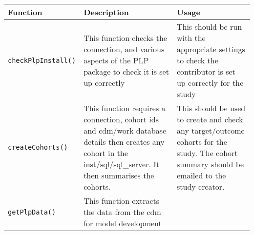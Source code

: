 \documentclass[]{article}
\begin{document}
\begin{longtable}[]{@{}lll@{}}
\toprule
\begin{minipage}[b]{0.11\columnwidth}\raggedright\strut
Function\strut
\end{minipage} & \begin{minipage}[b]{0.18\columnwidth}\raggedright\strut
Description\strut
\end{minipage} & \begin{minipage}[b]{0.10\columnwidth}\raggedright\strut
Usage\strut
\end{minipage}\tabularnewline
\midrule
\endhead
\begin{minipage}[t]{0.11\columnwidth}\raggedright\strut
\texttt{checkPlpInstall()}\strut
\end{minipage} & \begin{minipage}[t]{0.18\columnwidth}\raggedright\strut
This function checks the connection, and various aspects of the PLP
package to check it is set up correctly\strut
\end{minipage} & \begin{minipage}[t]{0.10\columnwidth}\raggedright\strut
This should be run with the appropriate settings to check the
contributor is set up correctly for the study\strut
\end{minipage}\tabularnewline
\begin{minipage}[t]{0.11\columnwidth}\raggedright\strut
\texttt{createCohorts()}\strut
\end{minipage} & \begin{minipage}[t]{0.18\columnwidth}\raggedright\strut
This function requires a connection, cohort ids and cdm/work database
details then creates any cohort in the inst/sql/sql\_server. It then
summarises the cohorts.\strut
\end{minipage} & \begin{minipage}[t]{0.10\columnwidth}\raggedright\strut
This should be used to create and check any target/outcome cohorts for
the study. The cohort summary should be emailed to the study
creator.\strut
\end{minipage}\tabularnewline
\begin{minipage}[t]{0.11\columnwidth}\raggedright\strut
\texttt{getPlpData()}\strut
\end{minipage} & \begin{minipage}[t]{0.18\columnwidth}\raggedright\strut
This function extracts the data from the cdm for model development\strut
\end{minipage} & \begin{minipage}[t]{0.10\columnwidth}\raggedright\strut

\end{minipage}
\end{longtable}
\end{document}
